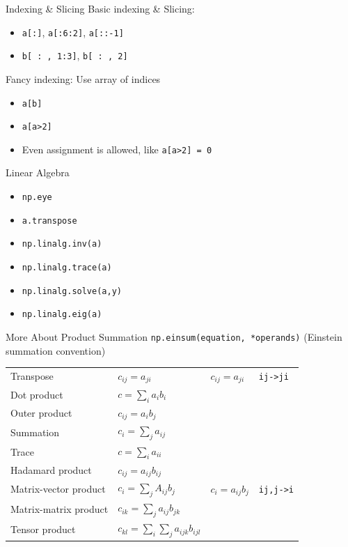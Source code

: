\documentclass{../TexTemplate/myslide}
\begin{document}
\begin{frame}[fragile]{Indexing \& Slicing}
Basic indexing \& Slicing:
\begin{itemize}
	\item \verb'a[:]', \verb'a[:6:2]', \verb'a[::-1]'
	\item \verb'b[ : , 1:3]', \verb'b[ : , 2]'
\end{itemize}
Fancy indexing: Use array of indices
\begin{itemize}
	\item \verb'a[b]'
	\item \verb'a[a>2]'
	\item Even assignment is allowed, like \verb'a[a>2] = 0'
\end{itemize}
\end{frame}

\begin{frame}[fragile]{Linear Algebra}
\begin{itemize}
	\item \verb'np.eye'
	\item \verb'a.transpose'
	\item \verb'np.linalg.inv(a)'
	\item \verb'np.linalg.trace(a)'
	\item \verb'np.linalg.solve(a,y)'
	\item \verb'np.linalg.eig(a)'
\end{itemize}
\end{frame}

\begin{frame}[fragile]{More About Product Summation}
\verb'np.einsum(equation, *operands)' (Einstein summation convention)
\small
\begin{center}
\begin{tabular}{llll}\hline\hline
Transpose & $c_{ij}=a_{ji}$ & $c_{ij}=a_{ji}$ & \verb'ij->ji' \\
Dot product & $c=\sum_i a_ib_i$ & \qquad\qquad & \qquad\qquad \\
Outer product & $c_{ij}=a_ib_j$ & \qquad\qquad & \qquad\qquad \\
Summation & $c_i=\sum_j a_{ij}$ & \qquad\qquad & \qquad\qquad \\
Trace & $c=\sum_i a_{ii}$ & \qquad\qquad & \qquad\qquad \\
Hadamard product & $c_{ij}=a_{ij}b_{ij}$ & \qquad\qquad & \qquad\qquad \\
Matrix-vector product & $c_i=\sum_jA_{ij}b_j$ & $c_i=a_{ij}b_j$ & \verb'ij,j->i' \\
Matrix-matrix product & $c_{ik}=\sum_ja_{ij}b_{jk}$ & \qquad\qquad & \qquad\qquad \\
Tensor product & $c_{kl}=\sum_i\sum_ja_{ijk}b_{ijl}$ & \qquad\qquad & \qquad\qquad \\
\hline
\end{tabular}
\end{center}
\end{frame}
\end{document}
